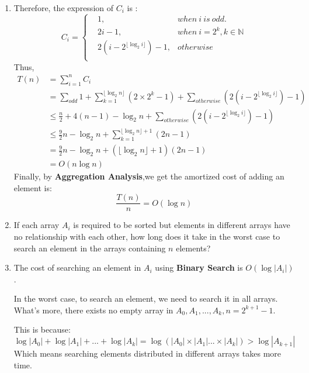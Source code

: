 \documentclass[12pt,a4paper]{article}
\makeatletter
\newtheorem*{solution}{Solution}
\theoremstyle{definition}
\renewenvironment{solution}[1][Solution] {\par\pushQED{\qed}\normalfont\topsep6\p@\@plus6\p@\relax\trivlist\item[\hskip\labelsep\bfseries#1\@addpunct{.}]\ignorespaces}{\popQED\endtrivlist\@endpefalse} \makeatother
\makeatother
\begin{document}
\begin{enumerate}
\begin{enumerate}
\begin{solution}
\begin{itemize}
\begin{center}
        \end{center}
        \end{itemize}
        Therefore, the expression of $C_i$ is :
        $$
        C_i = \left\{
        \begin{aligned}
        &1, &when\ i\ is\ odd.\\
        &2i-1, &when\ i=2^k,k\in \mathbb{N}\\
        &2(i-2 ^{\lfloor \log_2 i\rfloor})-1 ,&otherwise\\
        \end{aligned}
        \right.
        $$
        Thus,
        $$
        \begin{aligned}
        T(n)  
        &=\sum_{i=1}^n C_i\\
        &=\sum_{odd}1 + \sum_{k=1}^{\lfloor \log_2 n\rfloor}(2\times 2^k-1)+\sum_{otherwise}(2(i-2 ^{\lfloor \log_2 i\rfloor})-1)\\
        &\leq \frac n2 + 4(n-1)-\log_2n + \sum_{otherwise}(2(i-2 ^{\lfloor \log_2 i\rfloor})-1) \\
        &\leq \frac 92 n - \log_2 n + \sum_{k=1}^{\lfloor \log_2 n \rfloor+1} (2n-1)\\
        &=\frac 92 n - \log_2 n + (\lfloor \log_2 n \rfloor+1)(2n-1)\\
        & = O(n\log n)
        \end{aligned} 
        $$
        Finally, by \textbf{Aggregation Analysis},we get the amortized cost of adding an element is:
        $$
        \frac{T(n)}{n} = O(\log n)
        $$
        
        \end{solution}
        \item If each array $A_i$ is required to be sorted but elements in different arrays have no relationship with each other, how long does it take in the worst case to search an element in the arrays containing $n$ elements? 
        \begin{solution}
        The cost of searching an element in $A_i$ using \textbf{Binary Search} is $O(\log|A_i|)$.
        
        In the worst case, to search an element, we need to search it in all arrays.  What's more, there exists no empty array in $A_0, A_1,...,A_k,n=2^{k+1}-1$.
        
        This is because:
        $$
        \log|A_0| + \log|A_1| + ... + \log|A_k| = \log(|A_0|\times|A_1|...\times|A_k|)>\log|A_{k+1}|
        $$
        Which means searching elements distributed in different arrays takes more time.
        ~\\
        

\end{solution}
\end{enumerate}
\end{enumerate}
\end{document}
